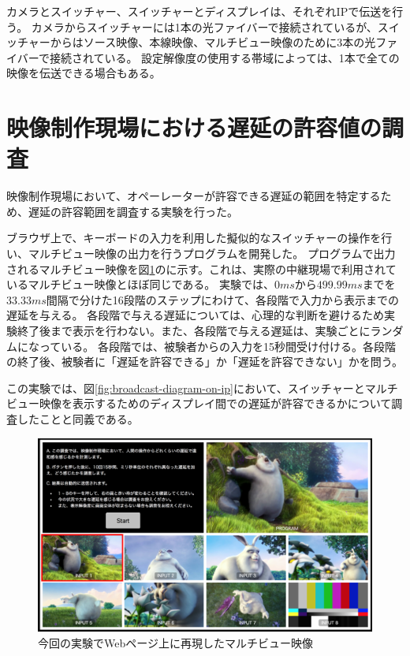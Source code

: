 カメラとスイッチャー、スイッチャーとディスプレイは、それぞれIPで伝送を行う。
カメラからスイッチャーには1本の光ファイバーで接続されているが、スイッチャーからはソース映像、本線映像、マルチビュー映像のために3本の光ファイバーで接続されている。
設定解像度の使用する帯域によっては、1本で全ての映像を伝送できる場合もある。

\section{映像制作現場における遅延の許容値の調査}

映像制作現場において、オペーレーターが許容できる遅延の範囲を特定するため、遅延の許容範囲を調査する実験を行った。

ブラウザ上で、キーボードの入力を利用した擬似的なスイッチャーの操作を行い、マルチビュー映像の出力を行うプログラムを開発した。
プログラムで出力されるマルチビュー映像を図\ref{fig:mv-delay-virtual}のに示す。これは、実際の中継現場で利用されているマルチビュー映像とほぼ同じである。
実験では、$0ms$から$499.99ms$までを$33.33ms$間隔で分けた16段階のステップにわけて、各段階で入力から表示までの遅延を与える。
各段階で与える遅延については、心理的な判断を避けるため実験終了後まで表示を行わない。また、各段階で与える遅延は、実験ごとにランダムになっている。
各段階では、被験者からの入力を15秒間受け付ける。各段階の終了後、被験者に「遅延を許容できる」か「遅延を許容できない」かを問う。

この実験では、図\ref{fig:broadcast-diagram-on-ip}において、スイッチャーとマルチビュー映像を表示するためのディスプレイ間での遅延が許容できるかについて調査したことと同義である。

\begin{figure}[htbp]
  \begin{center}
    \includegraphics[bb=0 0 1294 750,width=14cm]{img/mv-delay-virtual.png}
  \end{center}
  \caption{今回の実験でWebページ上に再現したマルチビュー映像}
  \label{fig:mv-delay-virtual}
\end{figure}

